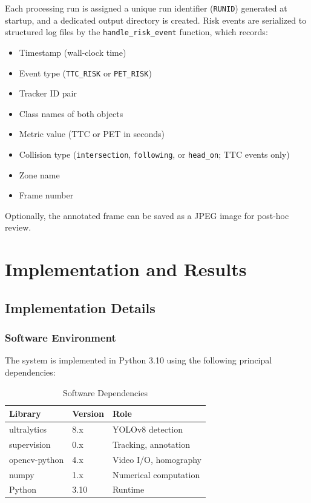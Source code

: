 \documentclass[12pt]{report}
\begin{document}
Each processing run is assigned a unique run identifier (\texttt{RUNID}) generated at startup, and a dedicated output directory is created.
Risk events are serialized to structured log files by the \texttt{handle\_risk\_event} function, which records:
\begin{itemize}
    \item Timestamp (wall-clock time)
    \item Event type (\texttt{TTC\_RISK} or \texttt{PET\_RISK})
    \item Tracker ID pair
    \item Class names of both objects
    \item Metric value (TTC or PET in seconds)
    \item Collision type (\texttt{intersection}, \texttt{following}, or \texttt{head\_on}; TTC events only)
    \item Zone name
    \item Frame number
\end{itemize}
Optionally, the annotated frame can be saved as a JPEG image for post-hoc review.

\chapter{Implementation and Results}

\section{Implementation Details}

\subsection{Software Environment}

The system is implemented in Python 3.10 using the following principal dependencies:

\begin{table}[H]
    \centering
    \caption{Software Dependencies}
    \label{tab:dependencies}
    \begin{tabular}{lll}
        \toprule
        \textbf{Library} & \textbf{Version} & \textbf{Role} \\
        \midrule
        ultralytics & 8.x & YOLOv8 detection \\
        supervision & 0.x & Tracking, annotation \\
        opencv-python & 4.x & Video I/O, homography \\
        numpy & 1.x & Numerical computation \\
        Python & 3.10 & Runtime \\
        \bottomrule
    \end{tabular}
\end{table}
\end{document}
